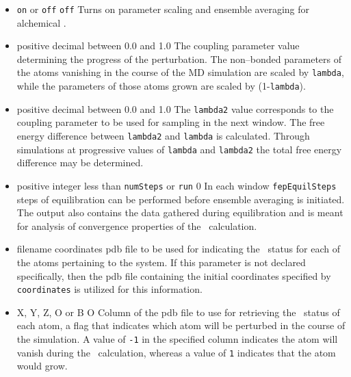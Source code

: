 \begin{itemize}

\item
{}
{{\tt on} or {\tt off}}
{{\tt off}}
{Turns on parameter scaling and ensemble averaging for alchemical \FEP.}

\item
{}
{positive decimal between 0.0 and 1.0}
{The coupling parameter value determining the progress of the
perturbation. The non--bonded parameters of the atoms vanishing
in the course of the MD simulation are scaled by {\tt lambda}, while
the parameters of those atoms grown are scaled by (1-{\tt lambda}).}

\item
{}
{positive decimal between 0.0 and 1.0}
{The {\tt lambda2} value corresponds to the coupling parameter to be
used for sampling in the next window.  The free energy difference
between {\tt lambda2} and {\tt lambda} is calculated.  Through simulations
at progressive values of {\tt lambda} and {\tt lambda2} the total free
energy difference may be determined.}

\item
{}
{positive integer less than {\tt numSteps} or {\tt run}}
{0}
{In each window {\tt fepEquilSteps} steps of equilibration can be
performed before ensemble averaging is initiated. The output also contains
the data gathered during equilibration and is meant for analysis of
convergence properties of the \FEP\ calculation.}

\item
{}
{filename}
{coordinates}
{pdb file to be used for indicating the \FEP\ status for each of
the atoms pertaining to the system. 
If this parameter is not declared specifically, then the
pdb file containing the initial coordinates specified by
{\tt coordinates} is utilized for this information.}

\item
{}
{X, Y, Z, O or B}
{O}
{Column of the pdb file to use for retrieving the \FEP\ status 
of each atom, \ie a flag that indicates which atom will be perturbed
in the course of the simulation.
A value of {\tt -1} in the specified column indicates the atom will
vanish during the \FEP\ calculation, whereas a value of {\tt 1} 
indicates that the atom would grow.}


\end{itemize}
